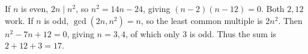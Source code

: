 If $n$ is even, $2n\mid n^2$, so $n^2=14n-24$, giving $(n-2)(n-12)=0$. Both $2,12$ work. If $n$ is odd, $\gcd(2n,n^2)=n$, so the least common multiple is $2n^2$. Then $n^2-7n+12=0$, giving $n=3,4$, of which only $3$ is odd. Thus the sum is $2+12+3=\boxed{17}$.

